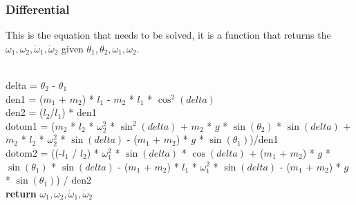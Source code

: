 \documentclass[12pt]{article}
\begin{document}
 \newpage
\subsubsection{Differential}
This is the equation that needs to be solved, it is a function that returns the $\omega_1, \omega_2, \dot\omega_1, \dot\omega_2$ given $\theta_1, \theta_2, \omega_1, \omega_2$.\\
\begin{algorithmic}
\\
    \State delta = $\theta_2$ - $\theta_1$\\
    \State den1 = ($m_1$ + $m_2$) * $l_1$ - $m_2$ * $l_1$ * $\cos^2(delta)$\\
    \State den2 = ($l_2$/$l_1$) * den1 \\

    \State dotom1 = ($m_2$ * $l_2$ * $\omega_2^2$ * $\sin^2(delta)$
    + $m_2$ * $g$ * $\sin(\theta_2)$ * $\sin(delta)$
    + $m_2$ * $l_2$ * $\omega^2_2$ * $\sin(delta)$
    - ($m_1$ + $m_2$) * $g$ * $\sin(\theta_1)$)/den1 \\

    \State dotom2 = ((-$l_1$ / $l_2$) * $\omega^2_1$ * $\sin(delta)$ * $\cos(delta)$
    + ($m_1$ + $m_2$) * $g$ * $\sin(\theta_1)$ * $\sin(delta)$
    - ($m_1$ + $m_2$) * $l_1$ * $\omega^2_1$ * $\sin(delta)$
    - ($m_1$ + $m_2$) * $g$ * $\sin(\theta_1)$)
    / den2 \\

    \State \textbf{return} $\omega_1, \omega_2, \dot\omega_1, \dot\omega_2$\\
    
\EndProcedure
\end{algorithmic}
\end{document}
